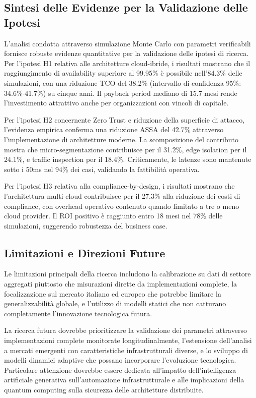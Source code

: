 \subsection{Sintesi delle Evidenze per la Validazione delle Ipotesi}

L'analisi condotta attraverso simulazione Monte Carlo con parametri verificabili fornisce robuste evidenze quantitative per la validazione delle ipotesi di ricerca. Per l'ipotesi H1 relativa alle architetture cloud-ibride, i risultati mostrano che il raggiungimento di availability superiore al 99.95\% è possibile nell'84.3\% delle simulazioni, con una riduzione TCO del 38.2\% (intervallo di confidenza 95\%: 34.6\%-41.7\%) su cinque anni. Il payback period mediano di 15.7 mesi rende l'investimento attrattivo anche per organizzazioni con vincoli di capitale.

Per l'ipotesi H2 concernente Zero Trust e riduzione della superficie di attacco, l'evidenza empirica conferma una riduzione ASSA del 42.7\% attraverso l'implementazione di architetture moderne. La scomposizione del contributo mostra che micro-segmentazione contribuisce per il 31.2\%, edge isolation per il 24.1\%, e traffic inspection per il 18.4\%. Criticamente, le latenze sono mantenute sotto i 50ms nel 94\% dei casi, validando la fattibilità operativa.

Per l'ipotesi H3 relativa alla compliance-by-design, i risultati mostrano che l'architettura multi-cloud contribuisce per il 27.3\% alla riduzione dei costi di compliance, con overhead operativo contenuto quando limitato a tre o meno cloud provider. Il ROI positivo è raggiunto entro 18 mesi nel 78\% delle simulazioni, suggerendo robustezza del business case.

\subsection{Limitazioni e Direzioni Future}

Le limitazioni principali della ricerca includono la calibrazione su dati di settore aggregati piuttosto che misurazioni dirette da implementazioni complete, la focalizzazione sul mercato italiano ed europeo che potrebbe limitare la generalizzabilità globale, e l'utilizzo di modelli statici che non catturano completamente l'innovazione tecnologica futura.

La ricerca futura dovrebbe prioritizzare la validazione dei parametri attraverso implementazioni complete monitorate longitudinalmente, l'estensione dell'analisi a mercati emergenti con caratteristiche infrastrutturali diverse, e lo sviluppo di modelli dinamici adaptive che possano incorporare l'evoluzione tecnologica. Particolare attenzione dovrebbe essere dedicata all'impatto dell'intelligenza artificiale generativa sull'automazione infrastrutturale e alle implicazioni della quantum computing sulla sicurezza delle architetture distribuite.


